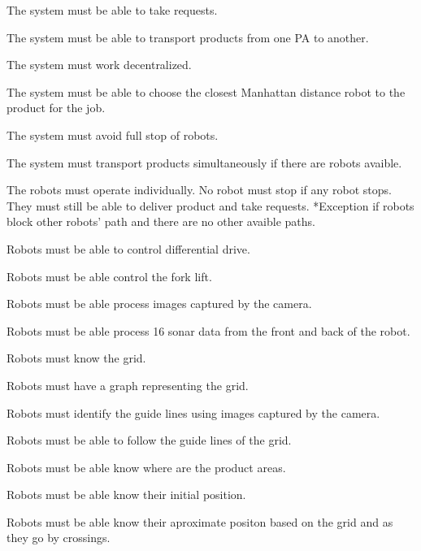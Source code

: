 \begin{FR}
	
	



	\item The system must be able to take requests. %
	\item The system must be able to transport products from one PA to another. %
	\item The system must work decentralized. %
	\item The system must be able to choose the closest Manhattan distance robot to the product for the job. %
	\item The system must avoid full stop of robots. %
	\item The system must transport products simultaneously if there are robots avaible. %
	\item The robots must operate individually. No robot must stop if any robot stops. They must still be able to deliver product and take requests. *Exception if robots block other robots' path and there are no other avaible paths. %
	\item Robots must be able to control differential drive. %
	\item Robots must be able control the fork lift. %
	\item Robots must be able process images captured by the camera. %
	\item Robots must be able process 16 sonar data from the front and back of the robot. %
	\item Robots must know the grid. %
	\item Robots must have a graph representing the grid. %
	\item Robots must identify the guide lines using images captured by the camera. %
	\item Robots must be able to follow the guide lines of the grid. %
	\item Robots must be able know where are the product areas. %
	\item Robots must be able know their initial position. %
	\item Robots must be able know their aproximate positon based on the grid and as they go by crossings. %

\end{FR}
